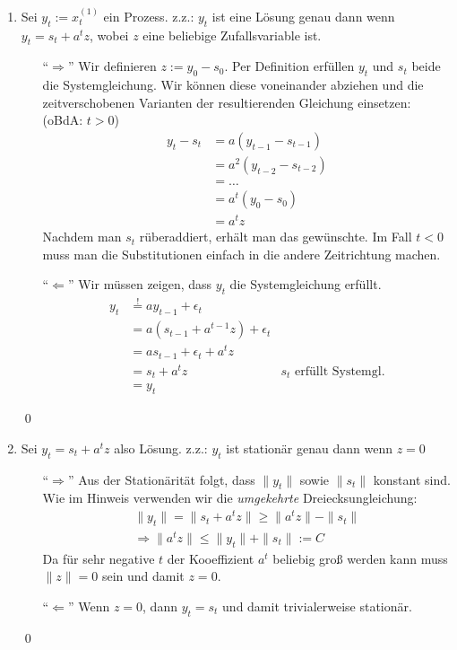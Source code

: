 \documentclass[a4paper,11pt,notitlepage,fullpage]{article}
\begin{document}
\begin{enumerate}
\begin{enumerate}
\item Sei $y_t := x_t^{(1)}$ ein Prozess. z.z.: $y_t$ ist eine Lösung genau dann wenn $y_t = s_t + a^t z$, wobei $z$ eine beliebige Zufallsvariable ist.
\begin{itemize}
\item[``$\Rightarrow$''] Wir definieren $z := y_0 - s_0$. Per Definition erfüllen $y_t$ und $s_t$ beide die Systemgleichung. Wir können diese voneinander abziehen und die zeitverschobenen Varianten der resultierenden Gleichung einsetzen: (oBdA: $t > 0$)
\begin{align*}
y_t - s_t &= a(y_{t-1}-s_{t-1}) \\
&= a^2(y_{t-2}-s_{t-2}) \\
&= \ldots \\
&= a^t(y_0-s_0) \\
&= a^t z
\end{align*}
Nachdem man $s_t$ rüberaddiert, erhält man das gewünschte. Im Fall $t < 0$ muss man die Substitutionen einfach in die andere Zeitrichtung machen.
\item[``$\Leftarrow$''] Wir müssen zeigen, dass $y_t$ die Systemgleichung erfüllt.
\begin{align*}
y_t &\stackrel{!}{=} ay_{t-1} + \epsilon_t \\
&= a(s_{t-1} + a^{t-1}z) + \epsilon_t \\
&= as_{t-1} + \epsilon_t + a^t z \\
&= s_t + a^t z & s_t \text{ erfüllt Systemgl.} \\
&= y_t
\end{align*}
\end{itemize} \qed

\item Sei $y_t = s_t + a^t z$ also Lösung. z.z.: $y_t$ ist stationär genau dann wenn $z = 0$
\begin{itemize}
\item[``$\Rightarrow$''] Aus der Stationärität folgt, dass $\|y_t\|$ sowie $\|s_t\|$ konstant sind. Wie im Hinweis verwenden wir die \emph{umgekehrte} Dreiecksungleichung:
\begin{align*}
\|y_t\| = \|s_t + a^t z\| \geq \|a^t z\| - \|s_t\|  \\
\Rightarrow \|a^t z\| \leq \|y_t\| + \|s_t\|  := C
\end{align*}
Da für sehr negative $t$ der Kooeffizient $a^t$ beliebig groß werden kann muss $\|z\| = 0$ sein und damit $z = 0$.
\item[``$\Leftarrow$''] Wenn $z = 0$, dann $y_t = s_t$ und damit trivialerweise stationär.
\end{itemize}\qed
\end{enumerate}



\end{enumerate}
\end{document}
